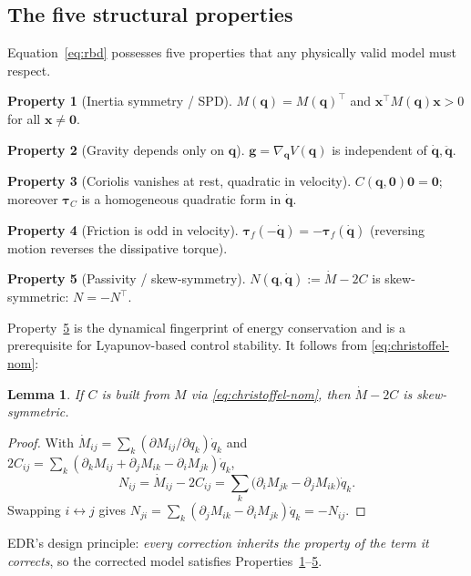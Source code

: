\documentclass[11pt]{article}
\newcommand{\q}{\bm{q}}
\newcommand{\qd}{\dot{\bm{q}}}
\newcommand{\qdd}{\ddot{\bm{q}}}
\newcommand{\tC}{\bm{\tau}_C}
\newcommand{\tf}{\bm{\tau}_f}
\newcommand{\Mmat}{M}
\newcommand{\Cmat}{C}
\newcommand{\transp}{^{\top}}
\theoremstyle{definition}
\newtheorem{property}{Property}
\theoremstyle{plain}
\newtheorem{lemma}{Lemma}
\begin{document}
\subsection{The five structural properties}
Equation~\eqref{eq:rbd} possesses five properties that any physically valid model
must respect.
\begin{property}[Inertia symmetry / SPD]\label{p:spd}
$\Mmat(\q)=\Mmat(\q)\transp$ and $\bm x\transp\Mmat(\q)\bm x>0$ for all
$\bm x\neq\bm 0$.
\end{property}
\begin{property}[Gravity depends only on $\q$]\label{p:grav}
$\bm g=\nabla_{\q} V(\q)$ is independent of $\qd,\qdd$.
\end{property}
\begin{property}[Coriolis vanishes at rest, quadratic in velocity]\label{p:cor}
$\Cmat(\q,\bm 0)\bm 0=\bm 0$; moreover $\tC$ is a homogeneous quadratic form in
$\qd$.
\end{property}
\begin{property}[Friction is odd in velocity]\label{p:fric}
$\tf(-\qd)=-\tf(\qd)$ (reversing motion reverses the dissipative torque).
\end{property}
\begin{property}[Passivity / skew-symmetry]\label{p:pass}
$N(\q,\qd):=\dot{\Mmat}-2\Cmat$ is skew-symmetric: $N=-N\transp$.
\end{property}
Property~\ref{p:pass} is the dynamical fingerprint of energy conservation and is a
prerequisite for Lyapunov-based control stability. It follows from
\eqref{eq:christoffel-nom}:
\begin{lemma}\label{lem:skew}
If $\Cmat$ is built from $\Mmat$ via \eqref{eq:christoffel-nom}, then
$\dot{\Mmat}-2\Cmat$ is skew-symmetric.
\end{lemma}
\begin{proof}
With $\dot{\Mmat}_{ij}=\sum_k(\partial\Mmat_{ij}/\partial q_k)\dot q_k$ and
$2\Cmat_{ij}=\sum_k(\partial_k\Mmat_{ij}+\partial_j\Mmat_{ik}-\partial_i\Mmat_{jk})\dot q_k$,
\begin{equation*}
N_{ij}=\dot{\Mmat}_{ij}-2\Cmat_{ij}
=\sum_k\big(\partial_i\Mmat_{jk}-\partial_j\Mmat_{ik}\big)\dot q_k .
\end{equation*}
Swapping $i\leftrightarrow j$ gives $N_{ji}=\sum_k(\partial_j\Mmat_{ik}-\partial_i\Mmat_{jk})\dot q_k=-N_{ij}$.
\end{proof}
EDR's design principle: \emph{every correction inherits the property of the term
it corrects}, so the corrected model satisfies
Properties~\ref{p:spd}--\ref{p:pass}.
\end{document}
